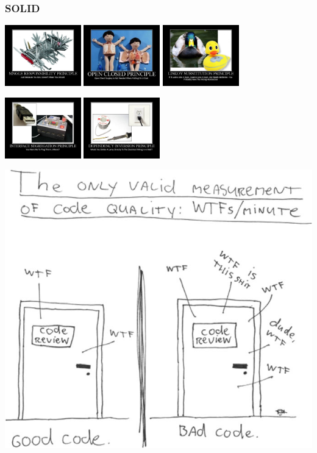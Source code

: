 \begin{frame}
    \frametitle{SOLID}

    \centering
    \includegraphics[height=100px]{figures/pratiques/srp}
    \includegraphics[height=100px]{figures/pratiques/ocp}
    \includegraphics[height=100px]{figures/pratiques/lsp}

    \includegraphics[height=100px]{figures/pratiques/isp}
    \includegraphics[height=100px]{figures/pratiques/dip}

\end{frame}

\begin{frame}
    \centering
    \includegraphics[height=0.5\linewidth]{figures/pratiques/wtf}
\end{frame}
